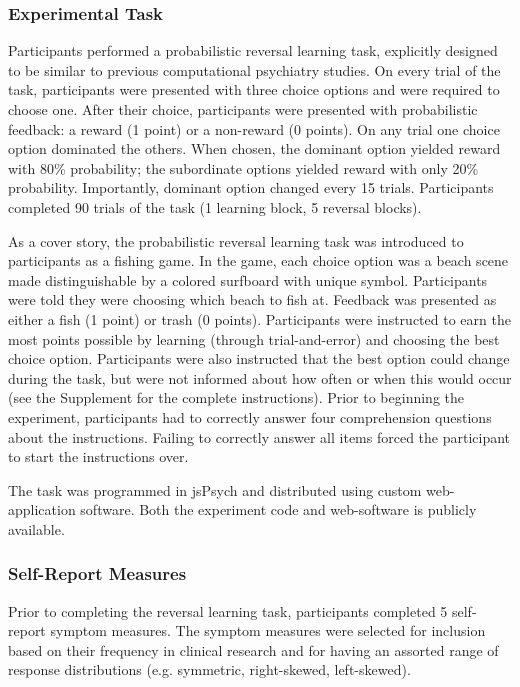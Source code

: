 \documentclass[a4paper,notitlepage,12pt]{article}
\begin{document}
\subsubsection{Experimental Task}

Participants performed a probabilistic reversal learning task, explicitly designed to be similar to previous computational psychiatry studies. On every trial of the task, participants were presented with three choice options and were required to choose one. After their choice, participants were presented with probabilistic feedback: a reward (1 point) or a non-reward (0 points). On any trial one choice option dominated the others. When chosen, the dominant option yielded reward with 80\% probability; the subordinate options yielded reward with only 20\% probability. Importantly, dominant option changed every 15 trials. Participants completed 90 trials of the task (1 learning block, 5 reversal blocks). 

As a cover story, the probabilistic reversal learning task was introduced to participants as a fishing game. In the game, each choice option was a beach scene made distinguishable by a colored surfboard with unique symbol. Participants were told they were choosing which beach to fish at. Feedback was presented as either a fish (1 point) or trash (0 points). Participants were instructed to earn the most points possible by learning (through trial-and-error) and choosing the best choice option. Participants were also instructed that the best option could change during the task, but were not informed about how often or when this would occur (see the Supplement for the complete instructions). Prior to beginning the experiment, participants had to correctly answer four comprehension questions about the instructions. Failing to correctly answer all items forced the participant to start the instructions over.

The task was programmed in jsPsych and distributed using custom web-application software. Both the experiment code and web-software is publicly available.

\subsubsection{Self-Report Measures}

Prior to completing the reversal learning task, participants completed 5 self-report symptom measures. The symptom measures were selected for inclusion based on their frequency in clinical research and for having an assorted range of response distributions (e.g. symmetric, right-skewed, left-skewed).
\end{document}
